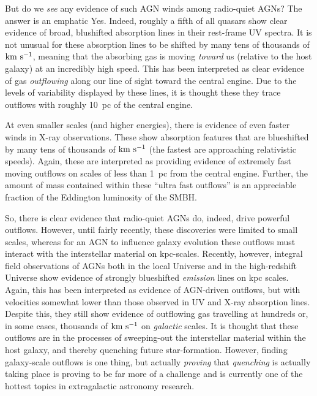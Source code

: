 \documentclass[11pt]{article}
\begin{document}
But do we {\it see} any evidence of such AGN winds among radio-quiet
AGNs?  The answer is an emphatic Yes. Indeed, roughly a fifth of all
quasars show clear evidence of broad, blushifted absorption lines in
their rest-frame UV spectra. It is not unusual for these absorption
lines to be shifted by many tens of thousands of ${\rm km~s^{-1}}$,
meaning that the absorbing gas is moving {\it toward} us (relative to
the host galaxy) at an incredibly high speed. This has been
interpreted as clear evidence of gas {\it outflowing} along our line
of sight toward the central engine. Due to the levels of variability
displayed by these lines, it is thought these they trace outflows with
roughly 10~pc of the central engine.

At even smaller scales (and higher energies), there is evidence of
even faster winds in X-ray observations. These show absorption
features that are blueshifted by many tens of thousands of
${\rm km~s^{-1}}$ (the fastest are approaching relativistic
speeds). Again, these are interpreted as providing evidence of
extremely fast moving outflows on scales of less than 1~pc from the
central engine. Further, the amount of mass contained within these
``ultra fast outflows'' is an appreciable fraction of the Eddington
luminosity of the SMBH.

So, there is clear evidence that radio-quiet AGNs do, indeed, drive
powerful outflows. However, until fairly recently, these discoveries
were limited to small scales, whereas for an AGN to influence galaxy
evolution these outflows must interact with the interstellar material
on kpc-scales. Recently, however, integral field observations of AGNs
both in the local Universe and in the high-redshift Universe show
evidence of strongly blueshifted {\it emission} lines on kpc
scales. Again, this has been interpreted as evidence of AGN-driven
outflows, but with velocities somewhat lower than those observed in UV
and X-ray absorption lines. Despite this, they still show evidence of
outflowing gas travelling at hundreds or, in some cases, thousands of
${\rm km~s^{-1}}$ on {\it galactic} scales. It is thought that these
outflows are in the processes of sweeping-out the interstellar
material within the host galaxy, and thereby quenching future
star-formation. However, finding galaxy-scale outflows is one thing,
but actually {\it proving} that {\it quenching} is actually taking
place is proving to be far more of a challenge and is currently one of
the hottest topics in extragalactic astronomy research.
\end{document}
